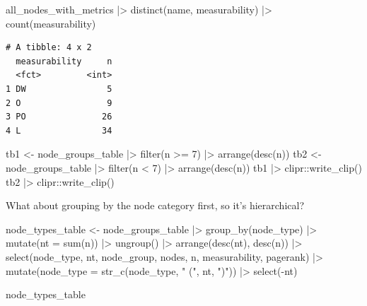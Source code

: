 \documentclass[
  letterpaper,
  DIV=11,
  numbers=noendperiod]{scrartcl}
\newenvironment{Shaded}{\begin{snugshade}}{\end{snugshade}}
\newcommand{\AttributeTok}[1]{\textcolor[rgb]{0.40,0.45,0.13}{#1}}
\newcommand{\DecValTok}[1]{\textcolor[rgb]{0.68,0.00,0.00}{#1}}
\newcommand{\FunctionTok}[1]{\textcolor[rgb]{0.28,0.35,0.67}{#1}}
\newcommand{\NormalTok}[1]{\textcolor[rgb]{0.00,0.23,0.31}{#1}}
\newcommand{\OtherTok}[1]{\textcolor[rgb]{0.00,0.23,0.31}{#1}}
\newcommand{\SpecialCharTok}[1]{\textcolor[rgb]{0.37,0.37,0.37}{#1}}
\newcommand{\StringTok}[1]{\textcolor[rgb]{0.13,0.47,0.30}{#1}}
\begin{document}
\begin{Shaded}
\begin{Highlighting}[]
\NormalTok{all\_nodes\_with\_metrics }\SpecialCharTok{|\textgreater{}} 
    \FunctionTok{distinct}\NormalTok{(name, measurability) }\SpecialCharTok{|\textgreater{}} \FunctionTok{count}\NormalTok{(measurability)}
\end{Highlighting}
\end{Shaded}

\begin{verbatim}
# A tibble: 4 x 2
  measurability     n
  <fct>         <int>
1 DW                5
2 O                 9
3 PO               26
4 L                34
\end{verbatim}

\begin{Shaded}
\begin{Highlighting}[]
\NormalTok{tb1 }\OtherTok{\textless{}{-}}\NormalTok{ node\_groups\_table }\SpecialCharTok{|\textgreater{}} \FunctionTok{filter}\NormalTok{(n }\SpecialCharTok{\textgreater{}=} \DecValTok{7}\NormalTok{) }\SpecialCharTok{|\textgreater{}} \FunctionTok{arrange}\NormalTok{(}\FunctionTok{desc}\NormalTok{(n))}
\NormalTok{tb2 }\OtherTok{\textless{}{-}}\NormalTok{ node\_groups\_table }\SpecialCharTok{|\textgreater{}} \FunctionTok{filter}\NormalTok{(n }\SpecialCharTok{\textless{}} \DecValTok{7}\NormalTok{) }\SpecialCharTok{|\textgreater{}} \FunctionTok{arrange}\NormalTok{(}\FunctionTok{desc}\NormalTok{(n))}
\NormalTok{tb1 }\SpecialCharTok{|\textgreater{}}\NormalTok{ clipr}\SpecialCharTok{::}\FunctionTok{write\_clip}\NormalTok{()}
\NormalTok{tb2 }\SpecialCharTok{|\textgreater{}}\NormalTok{ clipr}\SpecialCharTok{::}\FunctionTok{write\_clip}\NormalTok{()}
\end{Highlighting}
\end{Shaded}

What about grouping by the node category first, so it's hierarchical?

\begin{Shaded}
\begin{Highlighting}[]
\NormalTok{node\_types\_table }\OtherTok{\textless{}{-}} 
\NormalTok{    node\_groups\_table }\SpecialCharTok{|\textgreater{}} 
    \FunctionTok{group\_by}\NormalTok{(node\_type) }\SpecialCharTok{|\textgreater{}} 
    \FunctionTok{mutate}\NormalTok{(}\AttributeTok{nt =} \FunctionTok{sum}\NormalTok{(n)) }\SpecialCharTok{|\textgreater{}} 
    \FunctionTok{ungroup}\NormalTok{() }\SpecialCharTok{|\textgreater{}} 
    \FunctionTok{arrange}\NormalTok{(}\FunctionTok{desc}\NormalTok{(nt), }\FunctionTok{desc}\NormalTok{(n)) }\SpecialCharTok{|\textgreater{}} 
    \FunctionTok{select}\NormalTok{(node\_type, nt, node\_group, nodes, n, measurability, pagerank) }\SpecialCharTok{|\textgreater{}} 
    \FunctionTok{mutate}\NormalTok{(}\AttributeTok{node\_type =} \FunctionTok{str\_c}\NormalTok{(node\_type, }\StringTok{" ("}\NormalTok{, nt, }\StringTok{")"}\NormalTok{)) }\SpecialCharTok{|\textgreater{}} 
    \FunctionTok{select}\NormalTok{(}\SpecialCharTok{{-}}\NormalTok{nt)}

\NormalTok{node\_types\_table}
\end{Highlighting}
\end{Shaded}
\end{document}
